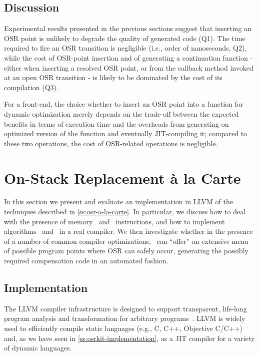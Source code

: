 \subsection{Discussion}
Experimental results presented in the previous sections suggest that inserting an OSR point is unlikely to degrade the quality of generated code (Q1). The time required to fire an OSR transition is negligible (i.e., order of nanoseconds, Q2), while the cost of OSR-point insertion and of generating a continuation function - either when inserting a resolved OSR point, or from the callback method invoked at an open OSR transition -
is likely to be dominated by the cost of its compilation (Q3).

For a front-end, the choice whether to insert an OSR point into a function for dynamic optimization merely depends on the trade-off between the expected benefits in terms of execution time and the overheads from generating on optimized version of the function and eventually JIT-compiling it; compared to these two operations, the cost of OSR-related operations is negligible. \missing


\section{On-Stack Replacement \`{a} la Carte}
\label{se:eval-OSR-alC}

In this section we present and evaluate an implementation in LLVM of the techniques described in \mysection\ref{ss:osr-a-la-carte}. In particular, we discuss how to deal with the presence of memory \load\ and \store\ instructions, and how to implement algorithms \apply\ and \buildcomp\ in a real compiler. We then investigate whether in the presence of a number of common compiler optimizations, \buildcomp\ can ``offer'' an extensive menu of possible program points where OSR can safely occur, generating the possibly required compensation code in an automated fashion.

\subsection{Implementation}
\label{ss:BC-implementation}
The LLVM compiler infrastructure is designed to support transparent, life-long program analysis and transformation for arbitrary programs~\cite{Lattner04}. LLVM is widely used to efficiently compile static languages (e.g., C, C++, Objective C/C++) and, as we have seen in \mysection\ref{ss:osrkit-implementation}, as a JIT compiler for a variety of dynamic languages.

